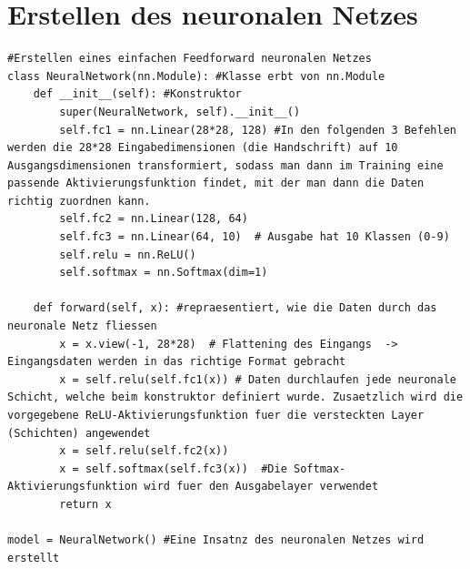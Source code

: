 \documentclass[a4paper,11pt,titlepage]{article}
\begin{document}
\section{Erstellen des neuronalen Netzes}
\begin{lstlisting}[style = python]
#Erstellen eines einfachen Feedforward neuronalen Netzes
class NeuralNetwork(nn.Module): #Klasse erbt von nn.Module
    def __init__(self): #Konstruktor
        super(NeuralNetwork, self).__init__()
        self.fc1 = nn.Linear(28*28, 128) #In den folgenden 3 Befehlen werden die 28*28 Eingabedimensionen (die Handschrift) auf 10 Ausgangsdimensionen transformiert, sodass man dann im Training eine passende Aktivierungsfunktion findet, mit der man dann die Daten richtig zuordnen kann. 
        self.fc2 = nn.Linear(128, 64)
        self.fc3 = nn.Linear(64, 10)  # Ausgabe hat 10 Klassen (0-9)
        self.relu = nn.ReLU()
        self.softmax = nn.Softmax(dim=1)

    def forward(self, x): #repraesentiert, wie die Daten durch das neuronale Netz fliessen
        x = x.view(-1, 28*28)  # Flattening des Eingangs  -> Eingangsdaten werden in das richtige Format gebracht
        x = self.relu(self.fc1(x)) # Daten durchlaufen jede neuronale Schicht, welche beim konstruktor definiert wurde. Zusaetzlich wird die vorgegebene ReLU-Aktivierungsfunktion fuer die versteckten Layer (Schichten) angewendet
        x = self.relu(self.fc2(x)) 
        x = self.softmax(self.fc3(x))  #Die Softmax-Aktivierungsfunktion wird fuer den Ausgabelayer verwendet
        return x

model = NeuralNetwork() #Eine Insatnz des neuronalen Netzes wird erstellt
\end{lstlisting}
\end{document}
